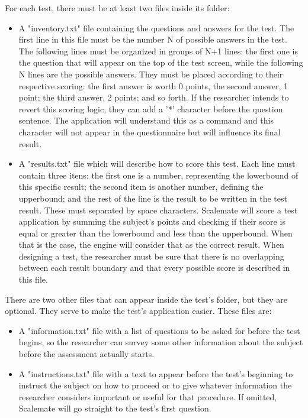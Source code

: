 \documentclass[12pt, a4paper, twoside]{article}
\begin{document}
For each test, there must be at least two files inside its folder:
\begin{itemize}
\item A "inventory.txt" file containing the questions and answers for the test. The first line in this file must be the number N of possible answers in the test. The following lines must be organized in groups of N+1 lines: the first one is the question that will appear on the top of the test screen, while the following N lines are the possible answers. They must be placed according to their respective scoring: the first answer is worth 0 points, the second answer, 1 point; the third answer, 2 points; and so forth. If the researcher intends to revert this scoring logic, they can add a '*' character before the question sentence. The application will understand this as a command and this character will not appear in the questionnaire but will influence its final result.
\item A "results.txt" file which will describe how to score this test. Each line must contain three itens: the first one is a number, representing the lowerbound of this specific result; the second item is another number, defining the upperbound; and the rest of the line is the result to be written in the test result. These must separated by space characters. Scalemate will score a test application by summing the subject's points and checking if their score is equal or greater than the lowerbound and less than the upperbound. When that is the case, the engine will consider that as the correct result. When designing a test, the researcher must be sure that there is no overlapping between each result boundary and that every possible score is described in this file.
\end{itemize}

There are two other files that can appear inside the test's folder, but they are optional. They serve to make the test's application easier. These files are:
\begin{itemize}
\item A "information.txt" file with a list of questions to be asked for before the test begins, so the researcher can survey some other information about the subject before the assessment actually starts.
\item A "instructions.txt" file with a text to appear before the test's beginning to instruct the subject on how to proceed or to give whatever information the researcher considers important or useful for that procedure. If omitted, Scalemate will go straight to the test's first question.
\end{itemize}
\end{document}
